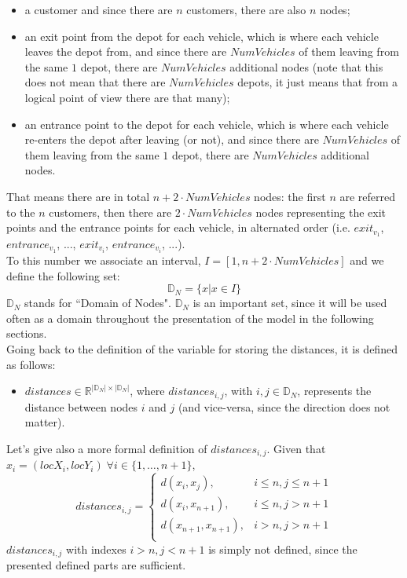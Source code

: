 \documentclass[../main.tex]{subfiles}
\begin{document}
\begin{itemize}
    \item a customer and since there are $n$ customers, there are also $n$ nodes;
    \item an exit point from the depot for each vehicle, which is where each vehicle leaves the depot from, and since there are $NumVehicles$ of them leaving from the same $1$ depot, there are $NumVehicles$ additional nodes (note that this does not mean that there are $NumVehicles$ depots, it just means that from a logical point of view there are that many);
    \item an entrance point to the depot for each vehicle, which is where each vehicle re-enters the depot after leaving (or not), and since there are $NumVehicles$ of them leaving from the same $1$ depot, there are $NumVehicles$ additional nodes.
\end{itemize}
That means there are in total $n + 2 \cdot NumVehicles$ nodes: the first $n$ are referred to the $n$ customers, then there are $2 \cdot NumVehicles$ nodes representing the exit points and the entrance points for each vehicle, in alternated order (i.e. $exit_{v_1}$, $entrance_{v_1}$, ..., $exit_{v_i}$, $entrance_{v_i}$, ...).\\
To this number we associate an interval, $I = [1, n + 2 \cdot NumVehicles]$ and we define the following set: $$\mathbb{D}_N = \{x | x \in I\}$$
$\mathbb{D}_N$ stands for ``Domain of Nodes".
$\mathbb{D}_N$ is an important set, since it will be used often as a domain throughout the presentation of the model in the following sections.\\
Going back to the definition of the variable for storing the distances, it is defined as follows:
\begin{itemize}
    \item $distances \in \mathbb{R}^{|\mathbb{D}_N|\times{}|\mathbb{D}_N|}$, where $distances_{i,j}$, with $i,j \in \mathbb{D}_N$, represents the distance between nodes $i$ and $j$ (and vice-versa, since the direction does not matter).
\end{itemize}
Let's give also a more formal definition of $distances_{i,j}$. Given that $x_i = (locX_i, locY_i) \; \forall i \in \{1,\dots,n+1\}$,
$$distances_{i,j} = {
    \begin{cases}
        d(x_i, x_j), & \text{$i \leq n, j \leq n+1$} \\
        d(x_i, x_{n+1}), & \text{$i \leq n, j > n+1$} \\
        d(x_{n+1}, x_{n+1}), & \text{$i > n, j > n+1$} \\
    \end{cases}
}$$
$distances_{i,j}$ with indexes $i > n, j < n+1$ is simply not defined, since the presented defined parts are sufficient.
\end{document}
